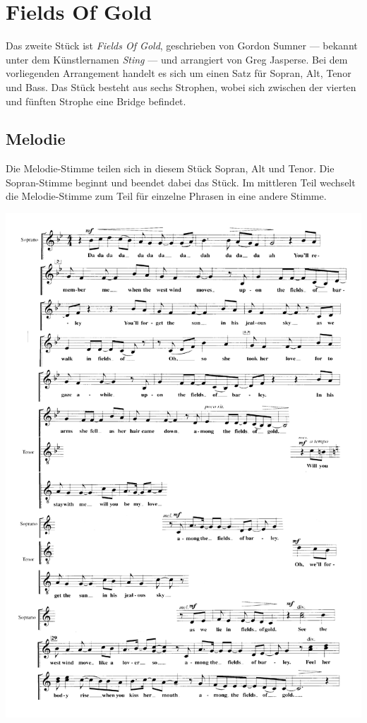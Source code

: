 \section{Fields Of Gold}

Das zweite Stück ist \textit{Fields Of Gold}, geschrieben von Gordon Sumner — bekannt unter dem Künstlernamen \textit{Sting} — und arrangiert von Greg Jasperse. Bei dem vorliegenden Arrangement handelt es sich um einen Satz für Sopran, Alt, Tenor und Bass. Das Stück besteht aus sechs Strophen, wobei sich zwischen der vierten und fünften Strophe eine Bridge befindet.


\subsection*{Melodie}

Die Melodie-Stimme teilen sich in diesem Stück Sopran, Alt und Tenor. Die Sopran-Stimme beginnt und beendet dabei das Stück. Im mittleren Teil wechselt die Melodie-Stimme zum Teil für einzelne Phrasen in eine andere Stimme.

\includegraphics[width=\textwidth]{resources/arrangements/Fields of Gold - Melody 01.png}

